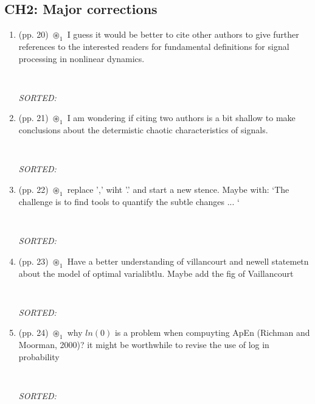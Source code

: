 \documentclass[12pt]{article}
\begin{document}
\subsection{CH2: Major corrections}
\begin{enumerate}

\item  (pp. 20) $\circledast_1$ 
	I guess it would be better to cite
	other authors to give further references
	to the interested readers for fundamental
	definitions for signal processing in 
	nonlinear dynamics.
	\begin{verbatim}
	
	\end{verbatim}
	\textit{
	SORTED:  
	}
	\\


\item  (pp. 21) $\circledast_1$ 
	I am wondering if citing two authors is a bit shallow
	to make conclusions about the determistic chaotic 
	characteristics of signals.
	\begin{verbatim}
	
	\end{verbatim}
	\textit{
	SORTED:  
	}
	\\

\item  (pp. 22) $\circledast_1$ 
	replace ',' wiht '.' and start a new stence. Maybe with:
	`The challenge is to find tools to quantify the 
	subtle changes ... 	`
	\begin{verbatim}
	
	\end{verbatim}
	\textit{
	SORTED:  
	}
	\\

\item  (pp. 23) $\circledast_1$ 
	Have a better understanding of villancourt and newell 
	statemetn about the model of optimal varialibtlu. 
	Maybe add the fig of Vaillancourt
	\begin{verbatim}
	
	\end{verbatim}
	\textit{
	SORTED:  
	}
	\\

\item  (pp. 24) $\circledast_1$ 
	why $ln(0)$ is a problem when compuyting ApEn (Richman and Moorman, 2000)?
	it might be worthwhile to revise the use of log in
	probability
	\begin{verbatim}
	
	\end{verbatim}
	\textit{
	SORTED:  
	}
	\\



\end{enumerate}
\end{document}
